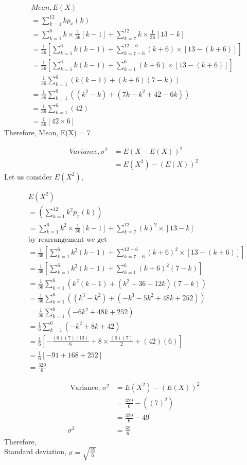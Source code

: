 \documentclass[journal,12pt,twocolumn]{IEEEtran}
\begin{document}
\allowdisplaybreaks
\begin{align}
    &Mean,E(X)\\
    & =\sum_{k=1}^{12} kp_x(k)\\
    & = \sum_{k=1}^{6}k\times\frac{1}{36}[k-1] + \sum_{k=7}^{12}k\times\frac{1}{36}[13-k]\\
    & = \frac{1}{36}\left[\sum_{k=1}^{6}k(k-1) + \sum_{k=7-6}^{12-6}(k+6)\times[13-(k+6)]\right]\\
    & = \frac{1}{36}\left[\sum_{k=1}^{6}k(k-1) + \sum_{k=1}^{6}(k+6)\times[13-(k+6)]\right]\\
    &= \frac{1}{36}\sum_{k=1}^{6}\left(k(k-1) + (k+6)(7-k)\right)\\
    &= \frac{1}{36}\sum_{k=1}^{6}\left((k^2- k)+ (7k-k^2+42-6k)\right)\\
    &= \frac{1}{36}\sum_{k=1}^{6}\left( 42\right)\\
    &= \frac{1}{36}\left[ 42 \times 6 \right]
\end{align}
Therefore,
 Mean, E(X) = 7
 
 \begin{align}
  Variance,\sigma^2 &= E(X-E(X))^2 \\
    &= E(X^2) - (E(X))^2
\end{align}
Let us consider $E(X^2)$,

\allowdisplaybreaks
\begin{align}
    & E(X^2)\\
    &= \left(\sum_{k=1}^{12}k^2p_x(k)\right)\\
    &= \sum_{k=1}^{6}k^2\times\frac{1}{36}[k-1] + 
    \sum_{k=7}^{12}(k)^2\times[13-k]\\
    &\text{by rearrangement we get}\\
    &= \frac{1}{36}\left[\sum_{k=1}^{6}k^2(k-1) + \sum_{k=7-6}^{12-6}(k+6)^2\times[13-(k+6)]\right]\\
    &= \frac{1}{36}\left[\sum_{k=1}^{6}k^2(k-1) + \sum_{k=1}^{6}(k+6)^2(7-k)\right]\\
    &= \frac{1}{36}\sum_{k=1}^{6}\left(k^2(k-1) + (k^2+36+12k)(7-k)\right)\\
    &= \frac{1}{36}\sum_{k=1}^{6}\left((k^3-k^2) + (-k^3-5k^2+48k+252)\right)\\
    &= \frac{1}{36}\sum_{k=1}^{6}(-6k^2+48k+252)\\
    &= \frac{1}{6}\sum_{k=1}^{6}(-k^2+8k+42)\\
    &= \frac{1}{6}\left[ -\frac{(6)(7)(13)}{6} + 8\times\frac{(6)(7)}{2}+ (42)(6) \right]\\
    &= \displaystyle\frac{1}{6}[-91+168+252]\\
    &= \displaystyle\frac{329}{6}
\end{align}

\begin{align}
    \text{ Variance, }\sigma^2 &= E(X^2)-(E(X))^2\\
    &= \displaystyle\frac{329}{6}- ((7)^2)\\
    &= \displaystyle\frac{329}{6} - 49\\
   \sigma^2 &= \displaystyle\frac{35}{6}
\end{align}
Therefore,\\
Standard deviation, $\sigma=\sqrt{\displaystyle\frac{35}{6}}$
\end{document}
